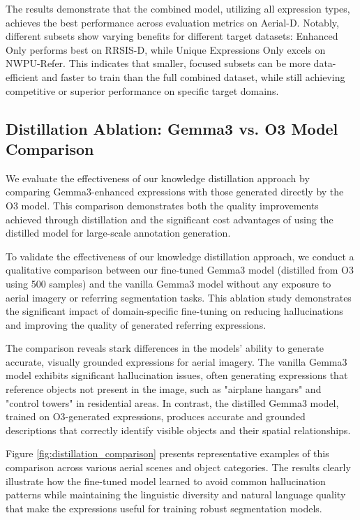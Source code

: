 The results demonstrate that the combined model, utilizing all expression types, achieves the best performance across evaluation metrics on Aerial-D. Notably, different subsets show varying benefits for different target datasets: Enhanced Only performs best on RRSIS-D, while Unique Expressions Only excels on NWPU-Refer. This indicates that smaller, focused subsets can be more data-efficient and faster to train than the full combined dataset, while still achieving competitive or superior performance on specific target domains.


\subsection{Distillation Ablation: Gemma3 vs. O3 Model Comparison}
\label{subsec:distillation_ablation}

We evaluate the effectiveness of our knowledge distillation approach by comparing Gemma3-enhanced expressions with those generated directly by the O3 model. This comparison demonstrates both the quality improvements achieved through distillation and the significant cost advantages of using the distilled model for large-scale annotation generation.

To validate the effectiveness of our knowledge distillation approach, we conduct a qualitative comparison between our fine-tuned Gemma3 model (distilled from O3 using 500 samples) and the vanilla Gemma3 model without any exposure to aerial imagery or referring segmentation tasks. This ablation study demonstrates the significant impact of domain-specific fine-tuning on reducing hallucinations and improving the quality of generated referring expressions.

The comparison reveals stark differences in the models' ability to generate accurate, visually grounded expressions for aerial imagery. The vanilla Gemma3 model exhibits significant hallucination issues, often generating expressions that reference objects not present in the image, such as "airplane hangars" and "control towers" in residential areas. In contrast, the distilled Gemma3 model, trained on O3-generated expressions, produces accurate and grounded descriptions that correctly identify visible objects and their spatial relationships.

Figure \ref{fig:distillation_comparison} presents representative examples of this comparison across various aerial scenes and object categories. The results clearly illustrate how the fine-tuned model learned to avoid common hallucination patterns while maintaining the linguistic diversity and natural language quality that make the expressions useful for training robust segmentation models.

